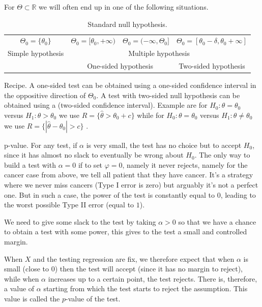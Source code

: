 \documentclass[
	fontsize=11pt, %
	twoside=false, %
	numbers=noenddot, %
]{kaobook}
\newcommand{\R}{\mathbb R}
\newcommand{\wh}{\widehat}
\begin{document}
For $\Theta \subset \R$ we will often end up in one of the following situations.

\begin{table}
\begin{tabular}{|c|c|c|c|}
	$\Theta_0 = \{ \theta_0 \}$ & $\Theta_0 = [\theta_0, +\infty)$ & $\Theta_0 = (-\infty, \Theta_0]$ & $\Theta_0 = [\theta_0 - \delta, \theta_0 + \infty]$ \\
	Simple hypothesis & \multicolumn{3}{c}{Multiple hypothesis} \\
	& \multicolumn{2}{c}{One-sided hypothesis} & Two-sided hypothesis
\end{tabular}
	\caption{Standard null hypothesis.}
	\label{tab:standard-null-hypothesis}
\end{table}


Recipe. A one-sided test can be obtained using a one-sided confidence interval in the oppositive direction of $\Theta_0$. A test with two-sided null hypothesis can be obtained using a (two-sided confidence interval).
Example are for $H_0 : \theta = \theta_0$ versus $H_1 : \theta > \theta_0$ we use $R = \{ \wh \theta > \theta_0 + c \}$ while for $H_0 : \theta = \theta_0$ versus $H_1 : \theta \neq \theta_0$ we use $R = \{ | \wh \theta - \theta_0 | > c \}$ .



p-value. For any test, if $\alpha$ is very small, the test has no choice but to accept $H_0$, since it has almost no slack to eventually be wrong about $H_0$.
The only way to build a test with $\alpha = 0$ if to set $\varphi = 0$, namely it never rejects, namely for the cancer case from above, we tell all patient that they have cancer. It's a strategy where we never miss cancers (Type I error is zero)
but arguably it's not a perfect one.
But in such a case, the power of the test is constantly equal to $0$, leading to the worst possible Type II error (equal to $1$).

We need to give some slack to the test by taking $\alpha > 0$ so that we have a chance to obtain a test with some power, this gives to the test a small and controlled margin.

When $X$ and the testing regression are fix, we therefore expect that when $\alpha$ is small (close to $0$) then the test will accept (since it has no margin to reject), while when $\alpha$ increases up to a certain point, the test rejects.
There is, therefore, a value of $\alpha$ starting from which the test starts to reject the assumption.
This value is called the $p$-value of the test.
\end{document}
